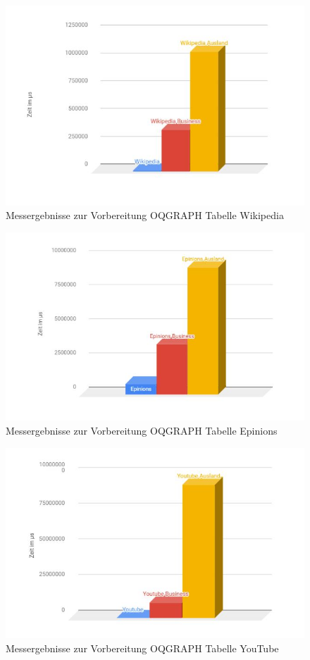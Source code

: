\begin{figure}
	\centering
	\includegraphics[width=\textwidth]{images/wikivor.jpg}
	\caption{Messergebnisse zur Vorbereitung OQGRAPH Tabelle Wikipedia}
	\label{fig:wikivor}
\end{figure}

\begin{figure}
	\centering
	\includegraphics[width=\textwidth]{images/epinvor.jpg}
	\caption{Messergebnisse zur Vorbereitung OQGRAPH Tabelle Epinions}
	\label{fig:epinvor}
\end{figure}

\begin{figure}
	\centering
	\includegraphics[width=\textwidth]{images/youtubvor.jpg}
	\caption{Messergebnisse zur Vorbereitung OQGRAPH Tabelle YouTube}
	\label{fig:youtubvor}
\end{figure}

